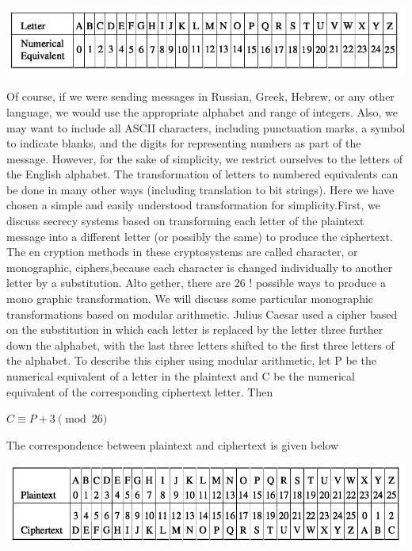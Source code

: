 \documentclass{report}
\theoremstyle{definition}
\begin{document}
{{\begin{center}
\includegraphics[scale=0.5]{"table.png"}
\end{center}

\Large{Of course, if we were sending messages in Russian, Greek, Hebrew, or any other
language, we would use the appropriate alphabet and range of integers. Also, we may
want to include all ASCII characters, including punctuation marks, a symbol to indicate
blanks, and the digits for representing numbers as part of the message. However, for
the sake of simplicity, we restrict ourselves to the letters of the English alphabet. The
transformation of letters to numbered equivalents can be done in many other ways
(including translation to bit strings). Here we have chosen a simple and easily understood
transformation for simplicity.First, we discuss secrecy systems based on transforming each letter of the plaintext
message into a different letter (or possibly the same) to produce the ciphertext. The en­
cryption methods in these cryptosystems are called character, or monographic, ciphers,because each character is changed individually to another letter by a substitution. Alto­
gether, there are 26 ! possible ways to produce a mono graphic transformation. We will
discuss some particular monographic transformations based on modular arithmetic.
Julius Caesar used a cipher based on the substitution in which each letter is replaced
by the letter three further down the alphabet, with the last three letters shifted to the first
three letters of the alphabet. To describe this cipher using modular arithmetic, let P be
the numerical equivalent of a letter in the plaintext and C be the numerical equivalent of
the corresponding ciphertext letter. Then

$C \equiv P+3\pmod{26}$

The correspondence between plaintext and ciphertext is given below}

\begin{center}
\includegraphics[scale=0.5]{"table2.png"}
\end{center}

}}
\end{document}
